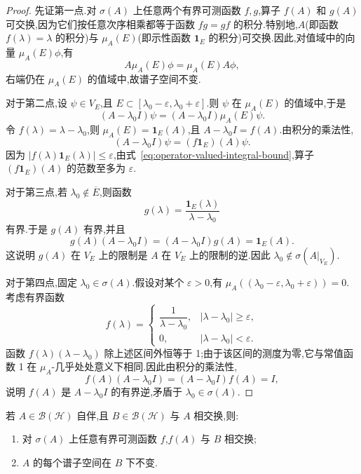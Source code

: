 \begin{proof}
先证第一点.对 \(\sigma(A)\) 上任意两个有界可测函数 \(f,g\),算子 \(f(A)\) 和 \(g(A)\) 可交换,因为它们按任意次序相乘都等于函数 \(fg=gf\) 的积分.特别地,\(A\)(即函数 \(f(\lambda)=\lambda\) 的积分)与 \(\mu_{A}(E)\)(即示性函数 \(\mathbf{1}_{E}\) 的积分)可交换.因此,对值域中的向量 \(\mu_{A}(E)\phi\),有
\[
A\mu_{A}(E)\phi=\mu_{A}(E)A\phi,
\]
右端仍在 \(\mu_{A}(E)\) 的值域中,故谱子空间不变.

对于第二点,设 \(\psi\in V_{E}\),且 \(E\subset[\lambda_{0}-\varepsilon,\lambda_{0}+\varepsilon]\).则 \(\psi\) 在 \(\mu_{A}(E)\) 的值域中,于是
\[
(A-\lambda_{0}I)\psi=(A-\lambda_{0}I)\mu_{A}(E)\psi.
\]
令 \(f(\lambda)=\lambda-\lambda_{0}\),则 \(\mu_{A}(E)=\mathbf{1}_{E}(A)\),且 \(A-\lambda_{0}I=f(A)\).由积分的乘法性,
\[
(A-\lambda_{0}I)\psi=(f\mathbf{1}_{E})(A)\psi.
\]
因为 \(|f(\lambda)\mathbf{1}_{E}(\lambda)|\leq\varepsilon\),由式~\eqref{eq:operator-valued-integral-bound},算子 \((f\mathbf{1}_{E})(A)\) 的范数至多为 \(\varepsilon\).

对于第三点,若 \(\lambda_{0}\notin\overline{E}\),则函数
\[
g(\lambda)=\frac{\mathbf{1}_{E}(\lambda)}{\lambda-\lambda_{0}}
\]
有界.于是 \(g(A)\) 有界,并且
\[
g(A)(A-\lambda_{0}I)=(A-\lambda_{0}I)g(A)=\mathbf{1}_{E}(A).
\]
这说明 \(g(A)\) 在 \(V_{E}\) 上的限制是 \(A\) 在 \(V_{E}\) 上的限制的逆.因此 \(\lambda_{0}\notin\sigma(A|_{V_{E}})\).

对于第四点,固定 \(\lambda_{0}\in\sigma(A)\).假设对某个 \(\varepsilon>0\),有 \(\mu_{A}((\lambda_{0}-\varepsilon,\lambda_{0}+\varepsilon))=0\).考虑有界函数
\[
f(\lambda)=
\begin{cases}
\dfrac{1}{\lambda-\lambda_{0}},&|\lambda-\lambda_{0}|\geq\varepsilon,\\
0,&|\lambda-\lambda_{0}|<\varepsilon.
\end{cases}
\]
函数 \(f(\lambda)(\lambda-\lambda_{0})\) 除上述区间外恒等于 1;由于该区间的测度为零,它与常值函数 1 在 \(\mu_{A}\)-几乎处处意义下相同.因此由积分的乘法性,
\[
f(A)(A-\lambda_{0}I)=(A-\lambda_{0}I)f(A)=I,
\]
说明 \(f(A)\) 是 \(A-\lambda_{0}I\) 的有界逆,矛盾于 \(\lambda_{0}\in\sigma(A)\).
\end{proof}

\begin{proposition}[与算子相交换的算子]\label{prop:commuting-operator-functional-calculus}
若 \(A\in\mathcal{B}(\mathcal{H})\) 自伴,且 \(B\in\mathcal{B}(\mathcal{H})\) 与 \(A\) 相交换,则:
\begin{enumerate}
\item 对 \(\sigma(A)\) 上任意有界可测函数 \(f\),\(f(A)\) 与 \(B\) 相交换;
\item \(A\) 的每个谱子空间在 \(B\) 下不变.
\end{enumerate}
\end{proposition}

